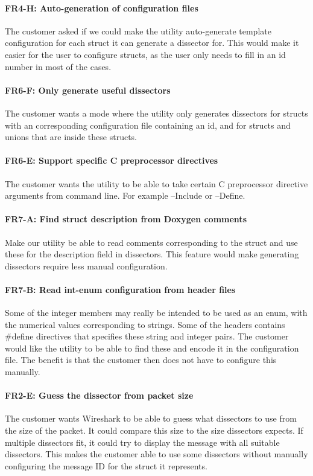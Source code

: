 \paragraph{FR4-H: Auto-generation of configuration files}
The customer asked if we could make the utility auto-generate template
configuration for each struct it can generate a dissector for. This would make
it easier for the user to configure structs, as the user only needs to fill
in an id number in most of the cases.

\paragraph{FR6-F: Only generate useful dissectors}
The customer wants a mode where the utility only generates dissectors for
structs with an corresponding configuration file containing an id, and for
structs and unions that are inside these structs.

\paragraph{FR6-E: Support specific C preprocessor directives}
The customer wants the utility to be able to take certain C preprocessor
directive arguments from command line. For example --Include or --Define.

\paragraph{FR7-A: Find struct description from Doxygen comments}
Make our utility be able to read comments corresponding to the struct and
use these for the description field in dissectors. This feature would make
generating dissectors require less manual configuration.

\paragraph{FR7-B: Read int-enum configuration from header files}
Some of the integer members may really be intended to be used as an enum,
with the numerical values corresponding to strings. Some of the headers
contains \#define directives that specifies these string and integer pairs.
The customer would like the utility to be able to find these and encode it
in the configuration file. The benefit is that the customer then does not
have to configure this manually.

\paragraph{FR2-E: Guess the dissector from packet size}
The customer wants Wireshark to be able to guess what dissectors to use
from the size of the packet. It could compare this size to the size dissectors
expects. If multiple dissectors fit, it could try to display the message with
all suitable dissectors. This makes the customer able to use some dissectors
without manually configuring the message ID for the struct it represents.

